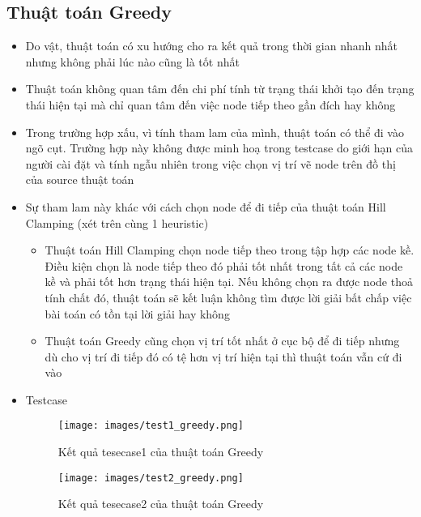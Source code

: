 \documentclass[a4paper, 12pt]{article}
\begin{document}
    \subsection{Thuật toán Greedy}
    \begin{itemize}
        \item Do vật, thuật toán có xu hướng cho ra kết quả trong thời gian nhanh nhất nhưng không phải lúc nào cũng là tốt nhất
        \item Thuật toán không quan tâm đến chi phí tính từ trạng thái khởi tạo đến trạng thái hiện tại mà chỉ quan tâm đến việc node tiếp theo gần đích hay không
        \item Trong trường hợp xấu, vì tính tham lam của mình, thuật toán có thể đi vào ngõ cụt. Trường hợp này không được minh hoạ trong testcase do giới hạn của người cài đặt và tính ngẫu nhiên trong việc chọn vị trí vẽ node trên đồ thị của source thuật toán
        \item Sự tham lam này khác với cách chọn node để đi tiếp của thuật toán Hill Clamping (xét trên cùng 1 heuristic)
        \begin{itemize}
            \item Thuật toán Hill Clamping chọn node tiếp theo trong tập hợp các node kề. Điều kiện chọn là node tiếp theo đó phải tốt nhất trong tất cả các node kề và phải tốt hơn trạng thái hiện tại. Nếu không chọn ra được node thoả tính chất đó, thuật toán sẽ kết luận không tìm được lời giải bất chấp việc bài toán có tồn tại lời giải hay không
            \item Thuật toán Greedy cũng chọn vị trí tốt nhất ở cục bộ để đi tiếp nhưng dù cho vị trí đi tiếp đó có tệ hơn vị trí hiện tại thì thuật toán vẫn cứ đi vào
        \end{itemize}
        \item Testcase
        \begin{figure}[H]
            \begin{center}
                \texttt{[image: images/test1\_greedy.png]}
                \caption{Kết quả tesecase1 của thuật toán Greedy}
                \texttt{[image: images/test2\_greedy.png]}
                \caption{Kết quả tesecase2 của thuật toán Greedy}
            \end{center}
        \end{figure}
    \end{itemize}
    \clearpage
\end{document}
